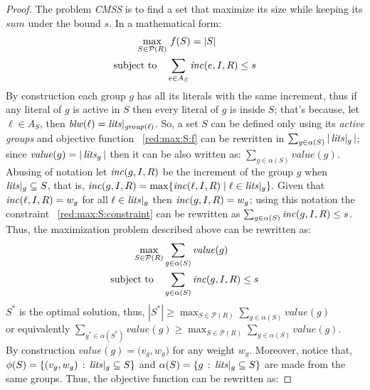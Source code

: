 \begin{proof}
    The problem \textit{CMSS} is to find a set that maximize its size while keeping its $\mathit{sum}$
    under the bound $s$. In a mathematical form:
    \begin{align}
        \label{red:max:S:f}
        \max_{S \in \mathcal{P}(R)} & \ f(S)=|S| \\
        \label{red:max:S:constraint}
        \text{subject to} \quad & \sum_{e \in A_S} \mathit{inc}(e,I,R) \le s 
    \end{align}
    By construction each group $g$ has all its literals with the same increment, thus if any literal of 
    $g$ is active in $S$ then every literal of $g$ is inside $S$; that's because, 
    let $\ell \in A_S$, then $\mathit{blw}(\ell) = \mathit{lits}|_{\mathit{group}(\ell)}$.
    So, a set $S$ can be defined only using its \textit{active groups}
    and objective function ~\ref{red:max:S:f} 
    can be rewritten in $\sum_{g \in \alpha(S)} |\,\mathit{lits}|_g\,|$;
    since $\mathit{value}(g) = |\,\mathit{lits}_g\,|$ then it can be also written as:
    $\sum_{g \in \alpha(S)} \mathit{value}(g)$.
    Abusing of notation let $\mathit{inc}(g,I,R)$ be the increment of the group $g$ when $\mathit{lits}|_g \subseteq S$,
    that is, $\mathit{inc}(g,I,R) = \max\{\mathit{inc}(\ell,I,R) \mid \ell \in \mathit{lits}|_g\}$.
    Given that $\mathit{inc}(\ell,I,R) = w_g$ for all $\ell \in \mathit{lits}|_g$ then $\mathit{inc}(g,I,R)  = w_g$;
    using this notation the constraint ~\ref{red:max:S:constraint} can be rewritten as 
    $\sum_{g \in \alpha(S)} \mathit{inc}(g,I,R) \le s$.
    Thus, the maximization problem described above can be rewritten as:
    \begin{align}
        \label{red:max:S:f:G}
        \max_{S \in \mathcal{P}(R)} & \sum_{g \in \alpha(S)} \mathit{value}(g) \\
        \label{red:max:S:constraint:G}
        \text{subject to} \quad & \sum_{g \in \alpha(S)} \mathit{inc}(g,I,R) \le s 
    \end{align}
    $S^*$ is the optimal solution, thus,
    $|S^*| \ge \max_{S \in \mathcal{P}(R)} \sum_{g \in \alpha(S)} \mathit{value}(g)$\\
    or equivalently 
    $\sum_{g^* \in \alpha(S^*)} \mathit{value}(g) 
    \ge \max_{S \in \mathcal{P}(R)} \sum_{g \in \alpha(S)} \mathit{value}(g)$.\\
    By construction $\mathit{value}(g) = \mathit(v_g, w_g)$ for any weight $w_g$.
    Moreover, notice that, $\phi(S) = \{(v_g, w_g) \,:\, \mathit{lits}|_g \subseteq S\}$
    and $\alpha(S) = \{g \,:\, \mathit{lits}|_g \subseteq S\}$ are made from the same 
    groups. Thus, the objective function can be rewritten as:

\end{proof}
